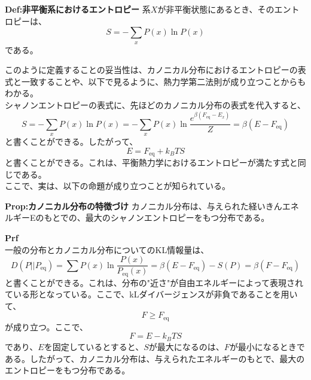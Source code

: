 \documentclass[a4paper,11pt]{jsarticle}
\numberwithin{equation}{section}
\begin{document}
\begin{itembox}[l]{\textbf{Def:非平衡系におけるエントロピー}}
    系$X$が非平衡状態にあるとき、そのエントロピーは、
    \begin{equation}
        S = -\sum_x P(x)\ln P(x)
    \end{equation}
    である。
\end{itembox}
このように定義することの妥当性は、カノニカル分布におけるエントロピーの表式と一致することや、以下で見るように、熱力学第二法則が成り立つことからもわかる。\\
シャノンエントロピーの表式に、先ほどのカノニカル分布の表式を代入すると、
\begin{equation}
    S = -\sum_x P(x)\ln P(x) = -\sum_x P(x)\ln \frac{e^{\beta(F_{\text{eq}}-E_x)}}{Z} = \beta (E-F_{\text{eq}})
\end{equation}
と書くことができる。したがって、
\begin{equation}
    E = F_{\text{eq}} +k_BT S
\end{equation}
と書くことができる。これは、平衡熱力学におけるエントロピーが満たす式と同じである。\\
ここで、実は、以下の命題が成り立つことが知られている。
\begin{itembox}[l]{\textbf{Prop:カノニカル分布の特徴づけ}}
    カノニカル分布は、与えられた経いきんエネルギーEのもとでの、最大のシャノンエントロピーをもつ分布である。
\end{itembox}
\textbf{Prf}\\
一般の分布とカノニカル分布についてのKL情報量は、
\begin{equation}
    D(P||P_{\text{eq}}) = \sum P(x)\ln \frac{P(x)}{P_{\text{eq}}(x)} =\beta(E-F_{\text{eq}})-S(P) = \beta(F-F_{\text{eq}})
\end{equation}
と書くことができる。これは、分布の"近さ"が自由エネルギーによって表現されている形となっている。ここで、kLダイバージェンスが非負であることを用いて、
\begin{equation}
    F \geq F_{\text{eq}}
\end{equation}
が成り立つ。ここで、
\begin{equation}
    F = E-k_BT S
\end{equation}
であり、$E$を固定しているとすると、$S$が最大になるのは、$F$が最小になるときである。したがって、カノニカル分布は、与えられたエネルギーのもとで、最大のエントロピーをもつ分布である。\\
\hfill \qedsymbol
\end{document}
